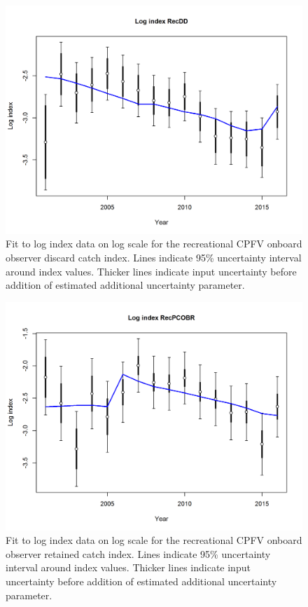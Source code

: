 \documentclass[12pt,]{article}
\begin{document}
\begin{figure}[htbp]
\centering
\includegraphics{r4ss/plots_mod1/index5_logcpuefit_RecDD.png}
\caption{Fit to log index data on log scale for the recreational CPFV
onboard observer discard catch index. Lines indicate 95\% uncertainty
interval around index values. Thicker lines indicate input uncertainty
before addition of estimated additional uncertainty parameter.
\label{fig:Fleet6_index5_logcpuefit_RecDD}}
\end{figure}

\begin{figure}[htbp]
\centering
\includegraphics{r4ss/plots_mod1/index5_logcpuefit_RecPCOBR.png}
\caption{Fit to log index data on log scale for the recreational CPFV
onboard observer retained catch index. Lines indicate 95\% uncertainty
interval around index values. Thicker lines indicate input uncertainty
before addition of estimated additional uncertainty parameter.
\label{fig:Fleet12_index5_logcpuefit_RecPCOBR}}
\end{figure}
\end{document}
